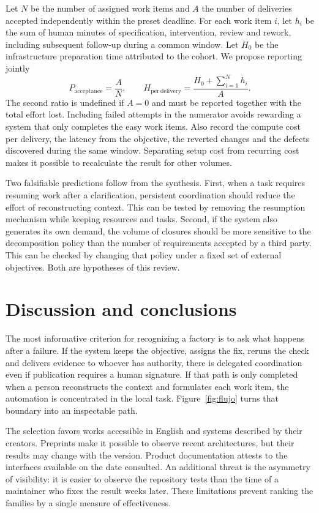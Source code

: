 \documentclass[11pt,a4paper]{article}
\begin{document}
Let $N$ be the number of assigned work items and $A$ the number of deliveries accepted independently within the preset deadline. For each work item $i$, let $h_i$ be the sum of human minutes of specification, intervention, review and rework, including subsequent follow-up during a common window. Let $H_0$ be the infrastructure preparation time attributed to the cohort. We propose reporting jointly
\[
   P_{\text{acceptance}}=\frac{A}{N},
   \qquad
   H_{\mathrm{per\ delivery}}=\frac{H_0+\sum_{i=1}^{N}h_i}{A}.
\]
The second ratio is undefined if $A=0$ and must be reported together with the total effort lost. Including failed attempts in the numerator avoids rewarding a system that only completes the easy work items. Also record the compute cost per delivery, the latency from the objective, the reverted changes and the defects discovered during the same window. Separating setup cost from recurring cost makes it possible to recalculate the result for other volumes.

Two falsifiable predictions follow from the synthesis. First, when a task requires resuming work after a clarification, persistent coordination should reduce the effort of reconstructing context. This can be tested by removing the resumption mechanism while keeping resources and tasks. Second, if the system also generates its own demand, the volume of closures should be more sensitive to the decomposition policy than the number of requirements accepted by a third party. This can be checked by changing that policy under a fixed set of external objectives. Both are hypotheses of this review.

\section{Discussion and conclusions}
The most informative criterion for recognizing a factory is to ask what happens after a failure. If the system keeps the objective, assigns the fix, reruns the check and delivers evidence to whoever has authority, there is delegated coordination even if publication requires a human signature. If that path is only completed when a person reconstructs the context and formulates each work item, the automation is concentrated in the local task. Figure~\ref{fig:flujo} turns that boundary into an inspectable path.

The selection favors works accessible in English and systems described by their creators. Preprints make it possible to observe recent architectures, but their results may change with the version. Product documentation attests to the interfaces available on the date consulted. An additional threat is the asymmetry of visibility: it is easier to observe the repository tests than the time of a maintainer who fixes the result weeks later. These limitations prevent ranking the families by a single measure of effectiveness.
\end{document}
